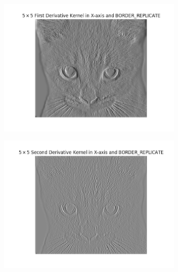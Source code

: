 \documentclass[11pt,a4paper]{article}
\begin{document}
\begin{figure}[H]
\begin{subfigure}{.5\textwidth}
	\centering
	\includegraphics[scale=0.45]{img/der-x1.png}
	\label{fig:der-x1}
\end{subfigure}
\begin{subfigure}{.5\textwidth}
	\centering
	\includegraphics[scale=0.45]{img/der-x2.png}
	\label{fig:der-x2}
\end{subfigure}
\end{figure}
\end{document}
